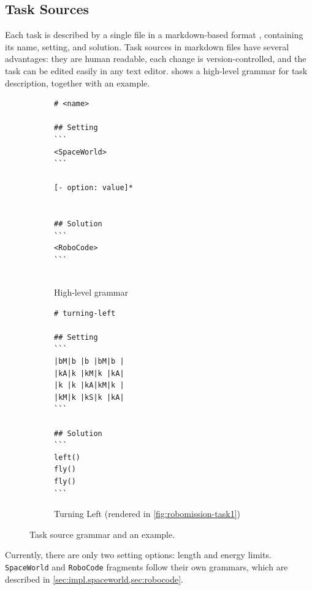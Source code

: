 \subsection{Task Sources}
\label{sec:impl.task-sources}

Each task is described by a single file in a markdown-based format \cite{markdown},
containing its name, setting, and solution.
Task sources in markdown files have several advantages: %
they are human readable,  %
each change is version-controlled,
and the task can be edited easily in any text editor.
 shows a high-level grammar for task description,
together with an example.

\begin{figure}[htb]
\centering
\begin{subfigure}{.49\textwidth}
{\lstset{numbers=none, showlines=true}
\begin{lstlisting}[basicstyle=\small\ttfamily]
# <name>

## Setting
```
<SpaceWorld>
```

[- option: value]*


## Solution
```
<RoboCode>
```


\end{lstlisting}}
\caption{High-level grammar}
\end{subfigure}
\begin{subfigure}{.49\textwidth}
{\lstset{numbers=none}
\begin{lstlisting}[basicstyle=\small\ttfamily]
# turning-left

## Setting
```
|bM|b |b |bM|b |
|kA|k |kM|k |kA|
|k |k |kA|kM|k |
|kM|k |kS|k |kA|
```

## Solution
```
left()
fly()
fly()
```
\end{lstlisting}}
\caption{Turning Left (rendered in \cref{fig:robomission-task1})}
\end{subfigure}
\caption{Task source grammar and an example.}
\label{fig:task-source}
\end{figure}

Currently, there are only two setting options: length and energy limits.
\texttt{SpaceWorld} and \texttt{RoboCode} fragments follow their own grammars, which
are described in \cref{sec:impl.spaceworld,sec:robocode}.

